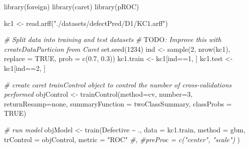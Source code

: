 \documentclass[
]{book}
\newenvironment{Shaded}{\begin{snugshade}}{\end{snugshade}}
\newcommand{\AlertTok}[1]{\textcolor[rgb]{0.94,0.16,0.16}{#1}}
\newcommand{\AttributeTok}[1]{\textcolor[rgb]{0.77,0.63,0.00}{#1}}
\newcommand{\CommentTok}[1]{\textcolor[rgb]{0.56,0.35,0.01}{\textit{#1}}}
\newcommand{\ConstantTok}[1]{\textcolor[rgb]{0.00,0.00,0.00}{#1}}
\newcommand{\DecValTok}[1]{\textcolor[rgb]{0.00,0.00,0.81}{#1}}
\newcommand{\FloatTok}[1]{\textcolor[rgb]{0.00,0.00,0.81}{#1}}
\newcommand{\FunctionTok}[1]{\textcolor[rgb]{0.00,0.00,0.00}{#1}}
\newcommand{\NormalTok}[1]{#1}
\newcommand{\OtherTok}[1]{\textcolor[rgb]{0.56,0.35,0.01}{#1}}
\newcommand{\SpecialCharTok}[1]{\textcolor[rgb]{0.00,0.00,0.00}{#1}}
\newcommand{\StringTok}[1]{\textcolor[rgb]{0.31,0.60,0.02}{#1}}
\begin{document}
\begin{Shaded}
\begin{Highlighting}[]
\FunctionTok{library}\NormalTok{(foreign)}
\FunctionTok{library}\NormalTok{(caret)}
\FunctionTok{library}\NormalTok{(pROC)}

\NormalTok{kc1 }\OtherTok{\textless{}{-}} \FunctionTok{read.arff}\NormalTok{(}\StringTok{"./datasets/defectPred/D1/KC1.arff"}\NormalTok{)}

\CommentTok{\# Split data into training and test datasets}
\CommentTok{\# }\AlertTok{TODO}\CommentTok{: Improve this with createDataParticion from Caret}
\FunctionTok{set.seed}\NormalTok{(}\DecValTok{1234}\NormalTok{)}
\NormalTok{ind }\OtherTok{\textless{}{-}} \FunctionTok{sample}\NormalTok{(}\DecValTok{2}\NormalTok{, }\FunctionTok{nrow}\NormalTok{(kc1), }\AttributeTok{replace =} \ConstantTok{TRUE}\NormalTok{, }\AttributeTok{prob =} \FunctionTok{c}\NormalTok{(}\FloatTok{0.7}\NormalTok{, }\FloatTok{0.3}\NormalTok{))}
\NormalTok{kc1.train }\OtherTok{\textless{}{-}}\NormalTok{ kc1[ind}\SpecialCharTok{==}\DecValTok{1}\NormalTok{, ]}
\NormalTok{kc1.test }\OtherTok{\textless{}{-}}\NormalTok{ kc1[ind}\SpecialCharTok{==}\DecValTok{2}\NormalTok{, ]}


\CommentTok{\# create caret trainControl object to control the number of cross{-}validations performed}
\NormalTok{objControl }\OtherTok{\textless{}{-}} \FunctionTok{trainControl}\NormalTok{(}\AttributeTok{method=}\StringTok{\textquotesingle{}cv\textquotesingle{}}\NormalTok{, }\AttributeTok{number=}\DecValTok{3}\NormalTok{, }\AttributeTok{returnResamp=}\StringTok{\textquotesingle{}none\textquotesingle{}}\NormalTok{, }\AttributeTok{summaryFunction =}\NormalTok{ twoClassSummary, }\AttributeTok{classProbs =} \ConstantTok{TRUE}\NormalTok{)}


\CommentTok{\# run model}
\NormalTok{objModel }\OtherTok{\textless{}{-}} \FunctionTok{train}\NormalTok{(Defective }\SpecialCharTok{\textasciitilde{}}\NormalTok{ .,}
                  \AttributeTok{data =}\NormalTok{ kc1.train,}
                  \AttributeTok{method =} \StringTok{\textquotesingle{}gbm\textquotesingle{}}\NormalTok{, }
                  \AttributeTok{trControl =}\NormalTok{ objControl,  }
                  \AttributeTok{metric =} \StringTok{"ROC"} \CommentTok{\#,}
                  \CommentTok{\#preProc = c("center", "scale")}
\NormalTok{                  )}
\end{Highlighting}
\end{Shaded}
\end{document}

